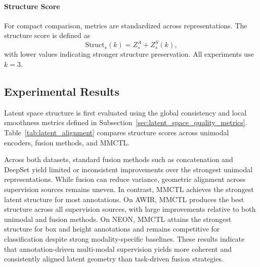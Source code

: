 \documentclass[lettersize,journal]{IEEEtran}
\begin{document}
\paragraph{Structure Score}
For compact comparison, metrics are standardized across representations. The structure score is defined as
\begin{equation}
\mathrm{Struct}_s(k)
=
Z^{A}_s
+
Z^{S}_s(k),
\end{equation}
with lower values indicating stronger structure preservation. All experiments use $k=3$.




\subsection{Experimental Results}
Latent space structure is first evaluated using the global consistency and local smoothness metrics defined in Subsection~\ref{sec:latent_space_quality_metrics}. Table~\ref{tab:latent_alignment} compares structure scores across unimodal encoders, fusion methods, and MMCTL.

Across both datasets, standard fusion methods such as concatenation and DeepSet yield limited or inconsistent improvements over the strongest unimodal representations. While fusion can reduce variance, geometric alignment across supervision sources remains uneven. In contrast, MMCTL achieves the strongest latent structure for most annotations. On AWIR, MMCTL produces the best structure across all supervision sources, with large improvements relative to both unimodal and fusion methods. On NEON, MMCTL attains the strongest structure for box and height annotations and remains competitive for classification despite strong modality-specific baselines. These results indicate that annotation-driven multi-modal supervision yields more coherent and consistently aligned latent geometry than task-driven fusion strategies.


\newcommand{\err}[1]{\,\scriptstyle\pm\,\!#1}
\end{document}
